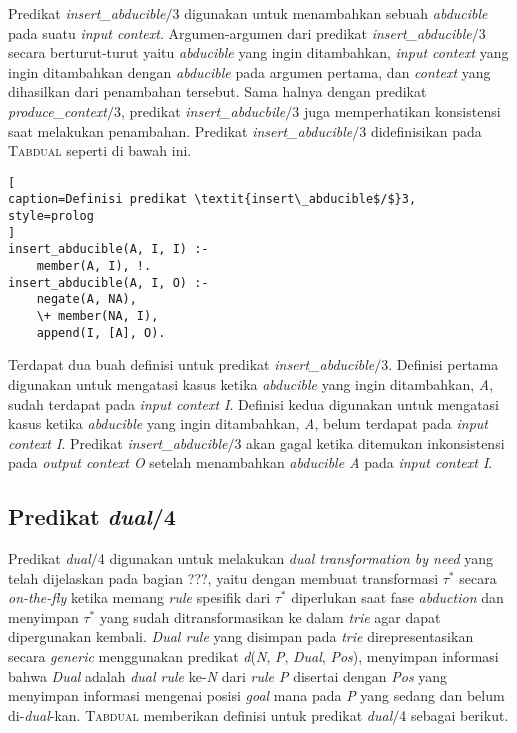 Predikat \textit{insert\_abducible$/$}3 digunakan untuk menambahkan sebuah \textit{abducible} pada suatu \textit{input context}. Argumen-argumen dari predikat \textit{insert\_abducible$/$}3 secara berturut-turut yaitu \textit{abducible} yang ingin ditambahkan, \textit{input context} yang ingin ditambahkan dengan \textit{abducible} pada argumen pertama, dan \textit{context} yang dihasilkan dari penambahan tersebut. Sama halnya dengan predikat \textit{produce\_context$/$}3, predikat \textit{insert\_abducbile$/$}3 juga memperhatikan konsistensi saat melakukan penambahan. Predikat \textit{insert\_abducible$/$}3 didefinisikan pada \textsc{Tabdual} seperti di bawah ini.
\\

\begin{lstlisting}[
caption=Definisi predikat \textit{insert\_abducible$/$}3,
style=prolog
]
insert_abducible(A, I, I) :-
	member(A, I), !.
insert_abducible(A, I, O) :-
	negate(A, NA),
	\+ member(NA, I),
	append(I, [A], O).
\end{lstlisting}

Terdapat dua buah definisi untuk predikat \textit{insert\_abducible$/$}3. Definisi pertama digunakan untuk mengatasi kasus ketika \textit{abducible} yang ingin ditambahkan, \textit{A}, sudah terdapat pada \textit{input context I}. Definisi kedua digunakan untuk mengatasi kasus ketika \textit{abducible} yang ingin ditambahkan, \textit{A}, belum terdapat pada \textit{input context I}. Predikat \textit{insert\_abducible$/$}3 akan gagal ketika ditemukan inkonsistensi pada \textit{output context O} setelah menambahkan \textit{abducible A} pada \textit{input context I}.

\subsection{Predikat \textit{dual}/4}

Predikat \textit{dual$/$}4 digunakan untuk melakukan \textit{dual transformation by need} yang telah dijelaskan pada bagian ???, yaitu dengan membuat transformasi $\tau^*$ secara \textit{on-the-fly} ketika memang \textit{rule} spesifik dari $\tau^*$ diperlukan saat fase \textit{abduction} dan menyimpan $\tau^*$ yang sudah ditransformasikan ke dalam \textit{trie} agar dapat dipergunakan kembali. \textit{Dual rule} yang disimpan pada \textit{trie} direpresentasikan secara \textit{generic} menggunakan predikat \textit{d}(\textit{N}, \textit{P}, \textit{Dual}, \textit{Pos}), menyimpan informasi bahwa \textit{Dual} adalah \textit{dual rule} ke-\textit{N} dari \textit{rule P} disertai dengan \textit{Pos} yang menyimpan informasi mengenai posisi \textit{goal} mana pada \textit{P} yang sedang dan belum di-\textit{dual}-kan. \textsc{Tabdual} memberikan definisi untuk predikat \textit{dual$/$}4 sebagai berikut.
\\

